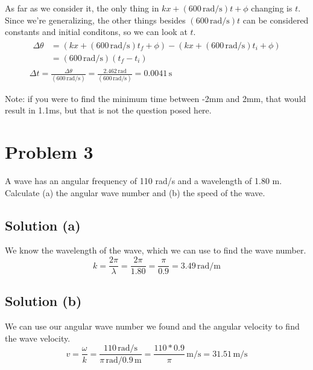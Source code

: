 \documentclass[12pt]{article}
\begin{document}
            As far as we consider it, the only thing in $kx + (600\,\unit{\radian/\second})t + \phi$ changing is $t$.
            Since we're generalizing, the other things besides $(600\,\unit{\radian/\second})t$ can be considered constants and initial conditons, so we can look at $t$.
            \begin{gather}
                \begin{align}
                    \Delta \theta &=    (kx + (600\,\unit{\radian/\second})t_f + \phi) - (kx + (600\,\unit{\radian/\second})t_i + \phi)\\
                        &=  (600\,\unit{\radian/\second}) (t_f - t_i)
                \end{align}\\
                \Delta t    =   \frac{\Delta \theta}{(600\,\unit{\radian/\second})}
                    =   \frac{2.462\,\unit{\radian}}{(600\,\unit{\radian/\second})}
                    =   \boxed{0.0041\,\unit{\second}}
            \end{gather}

            Note: if you were to find the minimum time between -2mm and 2mm, that would result in 1.1ms, but that is not the question posed here. 

    \pagebreak
    \section{Problem 3}
        A wave has an angular frequency of 110 rad/s and a wavelength of 1.80 m. 
        Calculate (a) the angular wave number and (b) the speed of the wave.

        \subsection{Solution (a)}
            We know the wavelength of the wave, which we can use to find the wave number.
            \begin{equation}
                k   =   \frac{2\pi}{\lambda}
                    =   \frac{2\pi}{1.80}
                    =   \frac{\pi}{0.9}
                    =   \boxed{3.49\,\unit{\radian/\meter}}
            \end{equation}

        \subsection{Solution (b)}
            We can use our angular wave number we found and the angular velocity to find the wave velocity.
            \begin{equation}
                v   =   \frac{\omega}{k}
                    =   \frac{110\,\unit{\radian/\second}}{\pi\,\unit{\radian}/0.9\,\unit{\meter}}
                    =   \frac{110 * 0.9}{\pi}\,\unit{\meter/\second}
                    =   \boxed{31.51\,\unit{\meter/\second}}
            \end{equation}
\end{document}
